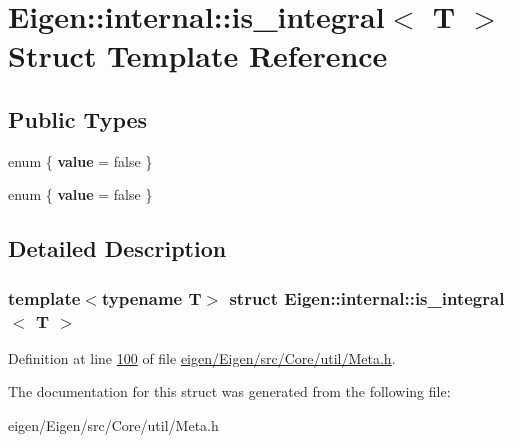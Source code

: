 \hypertarget{struct_eigen_1_1internal_1_1is__integral}{}\section{Eigen\+:\+:internal\+:\+:is\+\_\+integral$<$ T $>$ Struct Template Reference}
\label{struct_eigen_1_1internal_1_1is__integral}
\subsection*{Public Types}
\begin{DoxyCompactItemize}
\item 
\mbox{\label{struct_eigen_1_1internal_1_1is__integral_a2130294afd6e2a508f6ae4d3155ed9ec}} 
enum \{ {\bfseries value} = false
 \}
\item 
\mbox{\label{struct_eigen_1_1internal_1_1is__integral_a1f96fe3f2ee6d064cce4f669d4bfc384}} 
enum \{ {\bfseries value} = false
 \}
\end{DoxyCompactItemize}


\subsection{Detailed Description}
\subsubsection*{template$<$typename T$>$\newline
struct Eigen\+::internal\+::is\+\_\+integral$<$ T $>$}



Definition at line \hyperlink{eigen_2_eigen_2src_2_core_2util_2_meta_8h_source_l00100}{100} of file \hyperlink{eigen_2_eigen_2src_2_core_2util_2_meta_8h_source}{eigen/\+Eigen/src/\+Core/util/\+Meta.\+h}.



The documentation for this struct was generated from the following file\+:\begin{DoxyCompactItemize}
\item 
eigen/\+Eigen/src/\+Core/util/\+Meta.\+h\end{DoxyCompactItemize}
